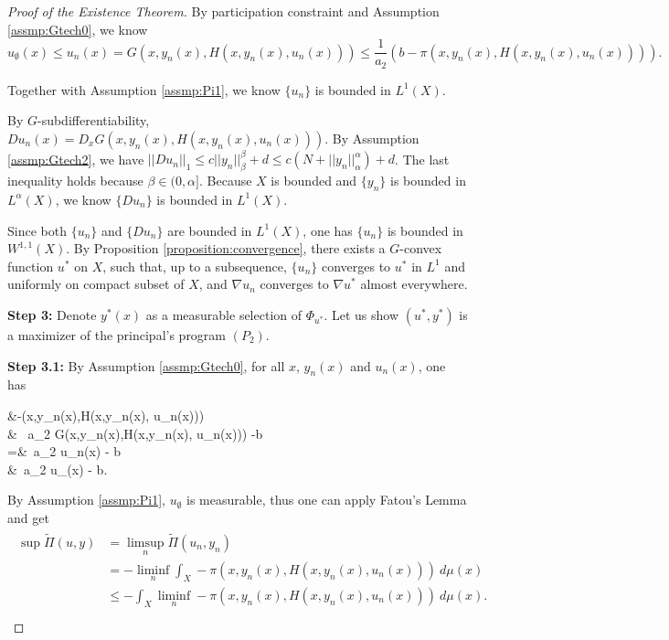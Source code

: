 \begin{proof}[Proof of the Existence Theorem]
	By participation constraint and Assumption \ref{assmp:Gtech0}, we know 
	\begin{equation*}
	u_{\emptyset}(x) \le u_n(x) = G(x,y_n(x),H(x,y_n(x),u_n(x))) \le \frac{1}{a_2}(b - \pi(x,y_n(x),H(x,y_n(x),u_n(x)))).
	\end{equation*}

	Together with Assumption \ref{assmp:Pi1}, we know $\{u_n\}$ is bounded in $L^1(X)$.

	By $G$-subdifferentiability, $Du_n(x) = D_x G(x, y_n(x), H(x,y_n(x),u_n(x)))$. By Assumption \ref{assmp:Gtech2}, we have $||Du_n||_{1}\le c||y_n||_{\beta}^{\beta}+d \le c(N+||y_n||_{\alpha}^{\alpha})+d$. The last inequality holds because $\beta \in (0, \alpha]$. Because $X$ is bounded and $\{y_n\}$ is bounded in $L^{\alpha}(X)$, we know $\{Du_n\}$ is bounded in $L^1(X)$.
	
	Since both $\{u_n\}$ and $\{Du_n\}$ are bounded in $L^1(X)$, one has $\{u_n\}$ is bounded in $W^{1,1}(X)$. By Proposition \ref{proposition:convergence}, there exists a $G$-convex function $u^*$ on $X$, such that, up to a subsequence, $\{u_n\}$ converges to $u^*$ in $L^1$ and uniformly on compact subset of $X$, and $\nabla u_n$ converges to $\nabla u^*$ almost everywhere.\medskip
	
	{\bf Step 3: } Denote $y^*(x)$ as a measurable selection of $\Phi_{u^*}$. Let us show $(u^*,y^*)$ is a maximizer of the principal's program $(P_2)$. \medskip
	
	{\bf Step 3.1: }By Assumption \ref{assmp:Gtech0}, for all $x$, $y_n(x)$ and $u_n(x)$,
	one has
	\begin{flalign*}
	&-\pi(x,y_n(x),H(x,y_n(x), u_n(x)))\\
	\ge & \ a_2 G(x,y_n(x),H(x,y_n(x), u_n(x))) -b \\
	=&\  a_2 u_n(x) - b \\
	\ge&\ a_2 u_{\emptyset}(x) - b.
	\end{flalign*}

 
	By Assumption \ref{assmp:Pi1}, $u_{\emptyset}$ is measurable, thus one can apply Fatou's Lemma and get
	\begin{align}\label{3}
	\begin{split}
	\sup \tilde{\Pi}(u,y) & = \limsup\limits_{n} \tilde{\Pi}(u_n, y_n) \\
	&= -\liminf\limits_{n} \int_{X} - \pi(x, y_n(x), H(x,y_n(x),u_n(x)))  ~d\mu(x)\\
	& \le - \int_{X} \liminf\limits_{n} - \pi(x, y_n(x), H(x,y_n(x),u_n(x)))~ d\mu(x). \\
	\end{split}
	\end{align}
	

\end{proof}
